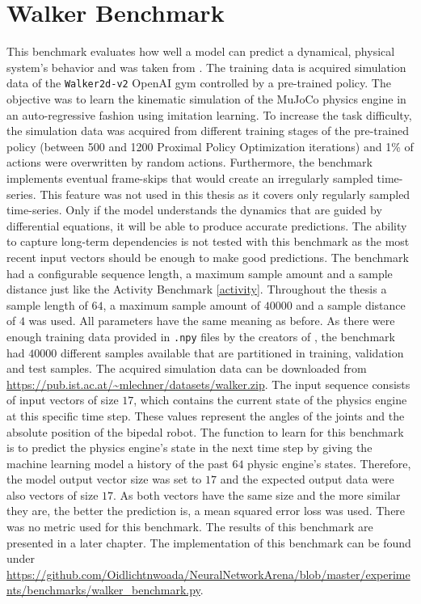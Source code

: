 \documentclass[draft,final]{vutinfth} %
\begin{document}
    \section{Walker Benchmark} \label{walker}
    This benchmark evaluates how well a model can predict a dynamical, physical system's behavior and was taken from \cite{ODELSTM}.
    The training data is acquired simulation data of the \texttt{Walker2d-v2} OpenAI gym \cite{OpenAIGym} controlled by a pre-trained policy.
    The objective was to learn the kinematic simulation of the MuJoCo physics engine \cite{MuJoCo} in an auto-regressive fashion using imitation learning.
    To increase the task difficulty, the simulation data was acquired from different training stages of the pre-trained policy (between 500 and 1200 Proximal Policy Optimization iterations) and 1\% of actions were overwritten by random actions.
    Furthermore, the benchmark implements eventual frame-skips that would create an irregularly sampled time-series. 
    This feature was not used in this thesis as it covers only regularly sampled time-series.
    Only if the model understands the dynamics that are guided by differential equations, it will be able to produce accurate predictions.
    The ability to capture long-term dependencies is not tested with this benchmark as the most recent input vectors should be enough to make good predictions.
    The benchmark had a configurable sequence length, a maximum sample amount and a sample distance just like the Activity Benchmark \ref{activity}.
    Throughout the thesis a sample length of $64$, a maximum sample amount of $40000$ and a sample distance of $4$ was used.
    All parameters have the same meaning as before.
    As there were enough training data provided in \texttt{.npy} files by the creators of \cite{ODELSTM}, the benchmark had $40000$ different samples available that are partitioned in training, validation and test samples.
    The acquired simulation data can be downloaded from \url{https://pub.ist.ac.at/~mlechner/datasets/walker.zip}.
    The input sequence consists of input vectors of size $17$, which contains the current state of the physics engine at this specific time step.
    These values represent the angles of the joints and the absolute position of the bipedal robot.
    The function to learn for this benchmark is to predict the physics engine's state in the next time step by giving the machine learning model a history of the past $64$ physic engine's states.
    Therefore, the model output vector size was set to $17$ and the expected output data were also vectors of size $17$.
    As both vectors have the same size and the more similar they are, the better the prediction is, a mean squared error loss was used.
    There was no metric used for this benchmark.
    The results of this benchmark are presented in a later chapter.
    The implementation of this benchmark can be found under \url{https://github.com/Oidlichtnwoada/NeuralNetworkArena/blob/master/experiments/benchmarks/walker_benchmark.py}.
\end{document}
